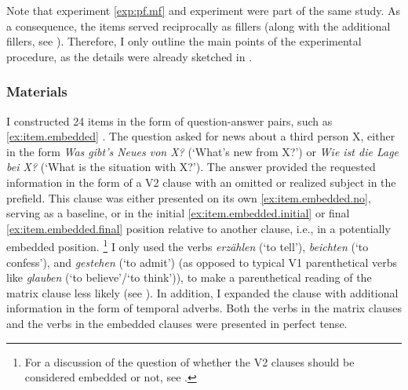 \largerpage[2]
Note that experiment \ref*{exp:pf.mf} and experiment  were part of the same study.
As a consequence, the items served reciprocally as fillers (along with the additional fillers, see ).
Therefore, I only outline the main points of the experimental procedure, as the details were already sketched in .\clearpage

\subsubsection{Materials}\label{sec:exp.emb.materials}
I constructed 24 items in the form of question-answer pairs, such as \ref{ex:item.embedded} .
The question asked for news about a third person X, either in the form \textit{Was gibt's Neues von X?} (`What's new from X?') or \textit{Wie ist die Lage bei X?} (`What is the situation with X?').
The answer provided the requested information in the form of a V2 clause with an omitted or realized subject in the prefield.
This clause was either presented on its own \ref{ex:item.embedded.no}, serving as a baseline, or in the initial \ref{ex:item.embedded.initial} or final \ref{ex:item.embedded.final} position relative to another clause, i.e., in a potentially embedded position.%
\footnote{For a discussion of the question of whether the V2 clauses should be considered embedded or not, see .}
%
I only used the verbs \textit{erzählen} (`to tell'), \textit{beichten} (`to confess'), and \textit{gestehen} (`to admit') (as opposed to typical V1 parenthetical verbs like \textit{glauben} (`to believe'/`to think')), to make a parenthetical reading of the matrix clause less likely (see ).
In addition, I expanded the clause with additional information in the form of temporal adverbs.
Both the verbs in the matrix clauses and the verbs in the embedded clauses were presented in perfect tense.

